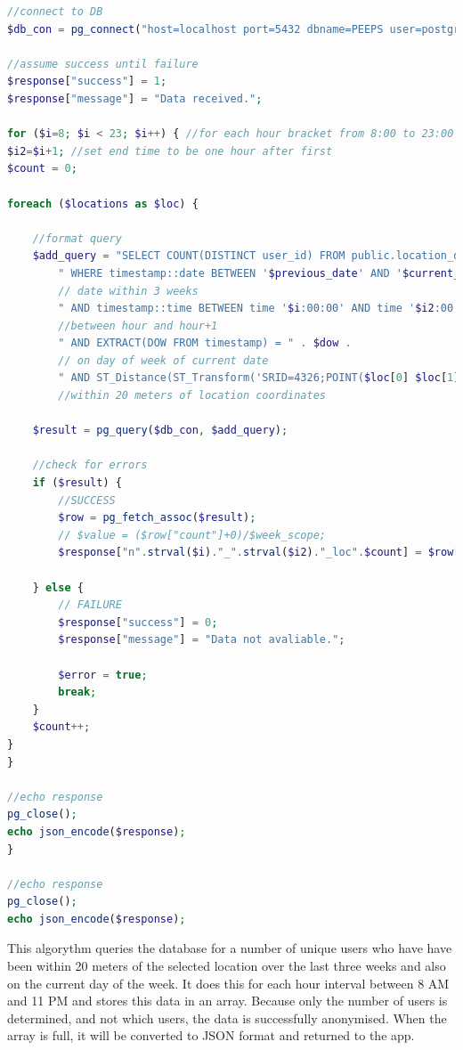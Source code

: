 \begin{lstlisting}[caption={\detokenize{get_pop_data.php's population-data extraction algorythm. }},label={lst:php_login},language=php]
//connect to DB
$db_con = pg_connect("host=localhost port=5432 dbname=PEEPS user=postgres password=admin");

//assume success until failure
$response["success"] = 1;
$response["message"] = "Data received.";

for ($i=8; $i < 23; $i++) { //for each hour bracket from 8:00 to 23:00
$i2=$i+1; //set end time to be one hour after first
$count = 0;

foreach ($locations as $loc) {

    //format query
    $add_query = "SELECT COUNT(DISTINCT user_id) FROM public.location_data" .
        " WHERE timestamp::date BETWEEN '$previous_date' AND '$current_date'" . 
        // date within 3 weeks
        " AND timestamp::time BETWEEN time '$i:00:00' AND time '$i2:00:00'" . 
        //between hour and hour+1
        " AND EXTRACT(DOW FROM timestamp) = " . $dow . 
        // on day of week of current date
        " AND ST_Distance(ST_Transform('SRID=4326;POINT($loc[0] $loc[1])' ::geometry, 3857), ST_Transform(ST_SetSRID(coordinates,4326),3857))  <= 20"; 
        //within 20 meters of location coordinates

    $result = pg_query($db_con, $add_query);

    //check for errors
    if ($result) {
        //SUCCESS
        $row = pg_fetch_assoc($result);
        // $value = ($row["count"]+0)/$week_scope;
        $response["n".strval($i)."_".strval($i2)."_loc".$count] = $row["count"]+0;

    } else {
        // FAILURE
        $response["success"] = 0;
        $response["message"] = "Data not avaliable.";

        $error = true;
        break;
    }
    $count++;
}
}

//echo response
pg_close();
echo json_encode($response);
}

//echo response
pg_close();
echo json_encode($response);
\end{lstlisting}

This algorythm queries the database for a number of unique users who have have been within 20 meters of the selected location over the last three weeks and also on the current day of the week. It does this for each hour interval between 8 AM and 11 PM and stores this data in an array. Because only the number of users is determined, and not which users, the data is successfully anonymised. When the array is full, it will be converted to JSON format and returned to the app.


